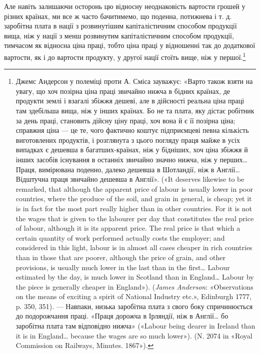 Але навіть залишаючи осторонь цю відносну неоднаковість
вартости грошей у різних країнах, ми все ж часто бачитимемо,
що поденна, потижнева і т. д. заробітна плата в нації з розвинутішим
капіталістичним способом продукції вища, ніж у нації
з менш розвинутим капіталістичним способом продукції, тимчасом
як відносна ціна праці, тобто ціна праці у відношенні
так до додаткової вартости, як і до вартости продукту, у другої
нації стоїть вище, ніж у першої.\footnote{
Джемс Андерсон у полеміці проти А. Сміса зауважує: «Варто
також взяти на увагу, що хоч позірна ціна праці звичайно нижча в бідних
країнах, де продукти землі і взагалі збіжжя дешеві, але в дійсності
реальна ціна праці там здебільша вища, ніж у інших країнах. Бо не та
плата, яку дістає робітник за день праці, становить дійсну ціну праці,
хоч вона й є її позірна ціна; справжня ціна — це те, чого фактично коштує
підприємцеві певна кількість виготовлених продуктів, і розглянута з
цього погляду праця майже в усіх випадках є дешевша в багатших-країнах,
ніж у бідніших, хоч ціна збіжжя й інших засобів існування в останніх
звичайно значно нижча, ніж у перших\dots{} Праця, вимірювана поденно,
далеко дешевша в Шотландії, ніж в Англії\dots{} Відштучна праця звичайно
дешевша в Англії». («It deserves likewise to be remarked, that although the
apparent price of labour is usually lower in poor countries, where the
produce of the soil, and grain in general, is cheap; yet it is in fact for the
most part really higher than in other countries. For it is not the wages that
is given to the labourer per day that constitutes the real price of labour,
although it is its apparent price. The real price is that which a certain
quantity of work performed actually costs the employer; and considered
in this light, labour is in almost all cases cheaper in rich countries than in
those that are poorer, although the price of grain, and other provisions, is
usually much lower in the last than in the first\dots{} Labour estimated by
the day, is much lower in Scotland than in England\dots{} Labour by the piece
is generally cheaper in England»). (\emph{James Anderson}: «Observations on
the means of exciting a spirit of National Industry etc.», Edinburgh 1777,
p. 350, 351). — Навпаки, низька заробітна плата з свого боку спричинюється
до подорожчання праці. «Праця дорожча в Ірляндії, ніж в Англії\dots{}
бо заробітна плата там відповідно нижча» («Labour being dearer in Ireland
than it is in England\dots{} because the wages are so much lower»).
(N. 2074 in «Royal Commission on Railways, Minutes. 1867»).
}

